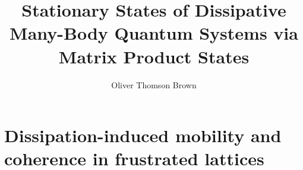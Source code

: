 \documentclass[a4paper,oneside,12pt]{hwthesis}
\author{Oliver Thomson Brown}
\title{Stationary States of Dissipative Many-Body Quantum Systems via Matrix Product States}
\newcommand*{\chappath}{../../include/chapters}
\newcommand*{\refpath}{../../include/refs}
\begin{document}
\maketitle
\tableofcontents

\chapter[Frustrated lattices]{Dissipation-induced mobility and coherence in frustrated lattices}





\end{document}
